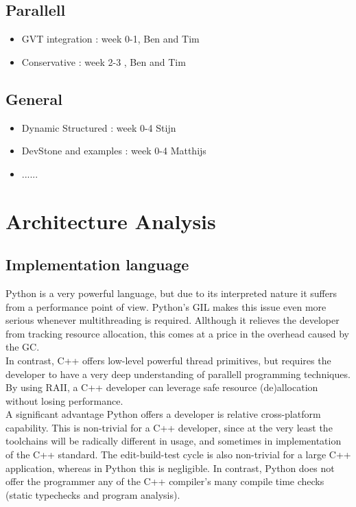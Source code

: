 \documentclass[8pt,a4paper]{report}
\begin{document}
\section{Parallell}
\begin {itemize}
\item GVT integration : week 0-1, Ben and Tim
\item Conservative : week 2-3 , Ben and Tim
\end {itemize}
\section{General}
\begin {itemize}
\item Dynamic Structured : week 0-4 Stijn
\item DevStone and examples : week 0-4 Matthijs
\item ......
\end {itemize}

\chapter{Architecture Analysis}
\section{Implementation language}
Python is a very powerful language, but due to its interpreted nature it suffers from a performance point of view. Python's GIL \cite{} makes this issue even more serious whenever multithreading is required. Allthough it relieves the developer from tracking resource allocation, this comes at a price in the overhead caused by the GC. \\
In contrast, C++ offers low-level powerful thread primitives, but requires the developer to have a very deep understanding of parallell programming techniques. By using RAII, a C++ developer can leverage safe resource (de)allocation without losing performance.\\
A significant advantage Python offers a developer is relative cross-platform capability. This is non-trivial for a C++ developer, since at the very least the toolchains will be radically different in usage, and sometimes in implementation of the C++ standard. The edit-build-test cycle is also non-trivial for a large C++ application, whereas in Python this is negligible. In contrast, Python does not offer the programmer any of the C++ compiler's many compile time checks (static typechecks and program analysis).
\end{document}
